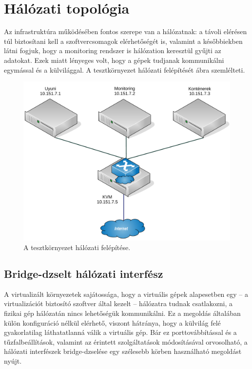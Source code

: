\section{Hálózati topológia}
Az infrastruktúra működésében fontos szerepe van a hálózatnak: a távoli elérésen túl biztosítani kell a szoftvercsomagok elérhetőségét is, valamint a későbbiekben látni fogjuk, hogy a monitoring rendszer is hálózation keresztül gyűjti az adatokat. Ezek miatt lényeges volt, hogy a gépek tudjanak kommunikálni egymással és a külvilággal. A tesztkörnyezet hálózati felépítését  ábra szemlélteti.

\begin{figure}[ht]
	\centering
	\includegraphics[width=15cm]{figures/halozat.pdf}
	\caption{A tesztkörnyezet hálózati felépítése.}
	\label{fig:test-env-network}
\end{figure}

\subsection{Bridge-dzselt hálózati interfész}
A virtualizált környezetek sajátossága, hogy a virtuális gépek alapesetben egy -- a virtualizációt biztosító szoftver által kezelt -- hálózatra tudnak csatlakozni, a fizikai gép hálózatán nincs lehetőségük kommunikálni. Ez a megoldás általában külön konfiguráció nélkül elérhető, viszont hátránya, hogy a külvilág felé gyakorlatilag láthatatlanná válik a virtuális gép. Bár ez porttovábbítással és a tűzfalbeállítások, valamint az érintett szolgáltatások módosításával orvosolható, a hálózati interfészek bridge-dzselése egy szélesebb körben használható megoldást nyújt.


